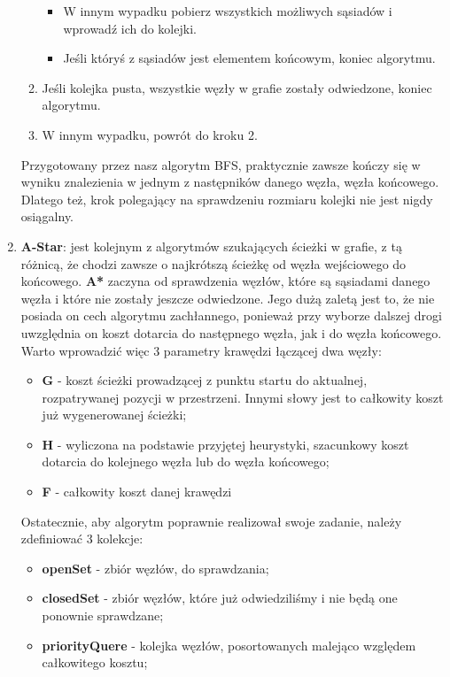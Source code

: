 \documentclass{classrep}
\begin{document}
\begin{enumerate}
\begin{enumerate}
\begin{itemize}
					\item W innym wypadku pobierz wszystkich możliwych sąsiadów i wprowadź ich do kolejki.
					\item Jeśli któryś z sąsiadów jest elementem końcowym, koniec algorytmu. 
				\end{itemize}
				\item Jeśli kolejka pusta, wszystkie węzły w grafie zostały odwiedzone, koniec algorytmu.
				\item W innym wypadku, powrót do kroku 2.
			\end{enumerate}
			Przygotowany przez nasz algorytm BFS, praktycznie zawsze kończy się w wyniku znalezienia
			w jednym z następników danego węzła, węzła końcowego. Dlatego też, krok polegający na 
			sprawdzeniu rozmiaru kolejki nie jest nigdy osiągalny.
			\item \textbf{A-Star}: jest kolejnym z algorytmów szukających ścieżki w grafie, z tą
			różnicą, że chodzi zawsze o najkrótszą ścieżkę od węzła wejściowego do końcowego. \textbf{A*}
			zaczyna od sprawdzenia węzłów, które są sąsiadami danego węzła i które nie zostały jeszcze odwiedzone.
			Jego dużą zaletą jest to, że nie posiada on cech algorytmu zachłannego, ponieważ przy
			wyborze dalszej drogi uwzględnia on koszt dotarcia do następnego węzła, jak i do węzła końcowego.
			Warto wprowadzić więc 3 parametry krawędzi łączącej dwa węzły:
			\begin{itemize}
				\item \textbf{G} - koszt ścieżki prowadzącej z punktu startu do aktualnej, rozpatrywanej pozycji
				w przestrzeni. Innymi słowy jest to całkowity koszt już wygenerowanej ścieżki;
				\item \textbf{H} - wyliczona na podstawie przyjętej heurystyki, szacunkowy koszt dotarcia do
				kolejnego węzła lub do węzła końcowego;
				\item \textbf{F} - całkowity koszt danej krawędzi
			\end{itemize}
			Ostatecznie, aby algorytm poprawnie realizował swoje zadanie, należy zdefiniować 3 kolekcje:
			\begin{itemize}
				\item \textbf{openSet} - zbiór węzłów, do sprawdzania;
				\item \textbf{closedSet} - zbiór węzłów, które już odwiedziliśmy i nie będą one ponownie sprawdzane;
				\item \textbf{priorityQuere} - kolejka węzłów, posortowanych malejąco względem całkowitego kosztu;
			\end{itemize}
		\end{enumerate}
	
\end{document}
